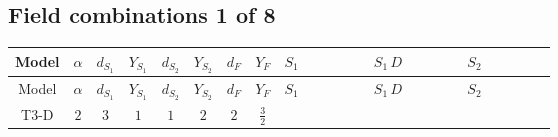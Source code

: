 \documentclass[8pt]{article}
\begin{document}
\begin{landscape}
\subsection*{Field combinations 1 of 8}
\begin{longtable}{@{}cccccccc >{\raggedright\arraybackslash}p{0.21\linewidth} >{\raggedright\arraybackslash}p{0.21\linewidth} >{\raggedright\arraybackslash}p{0.21\linewidth}@{}}
\toprule
Model & $\alpha$ & $d_{S_1}$ & $Y_{S_1}$ & $d_{S_2}$ & $Y_{S_2}$ & $d_F$ & $Y_F$ & $S_1$ & $S_1\,D$ & $S_2$ \\
\midrule
\endfirsthead
\toprule
Model & $\alpha$ & $d_{S_1}$ & $Y_{S_1}$ & $d_{S_2}$ & $Y_{S_2}$ & $d_F$ & $Y_F$ & $S_1$ & $S_1\,D$ & $S_2$ \\
\midrule
\endhead
T3-D & $2$ & $3$ & $1$ & $1$ & $2$ & $2$ & $\frac{3}{2}$ & \scriptsize\adjustbox{max width=\linewidth}{$\begin{gathered} +\frac{2 \hbar  \overline{y_{1,i_1,r_1}} \overline{y_{1,i_2,r_2}} S_{1,j_2}^2 y_{1,i_1,r_2} y_{1,i_2,r_1} \left(S_{1,j_1}{}^{\dagger }\right){}^2}{3 \epsilon } \\ -C_{S_1^\dagger S_1} S_{1,j_1} S_{1,j_1}{}^{\dagger } \\ +\frac{C_{S_1^\dagger S_1} \hbar  \overline{y_{1,i_1,r_1}} S_{1,j_1} y_{1,i_1,r_1} S_{1,j_1}{}^{\dagger }}{\sqrt{3}}\end{gathered}$} & \scriptsize\adjustbox{max width=\linewidth}{$\begin{gathered} +D_{\mu _1}\left(S_{1,j_1}\right){}^{\dagger } D_{\mu _1}\left(S_{1,j_1}\right)\end{gathered}$} & \scriptsize\adjustbox{max width=\linewidth}{$\begin{gathered} -\frac{2 \hbar  \overline{y_{2,i_1,r_1}} \overline{y_{2,i_2,r_2}} S_2^2 y_{2,i_1,r_2} y_{2,i_2,r_1} \left(S_2{}^{\dagger }\right){}^2}{\epsilon } \\ -C_{S_2^\dagger S_2} S_2 S_2{}^{\dagger } \\ +C_{S_2^\dagger S_2} \hbar  \overline{y_{2,i_1,r_1}} S_2 y_{2,i_1,r_1} S_2{}^{\dagger }\end{gathered}$} \\

\end{longtable}
\end{landscape}
\end{document}
